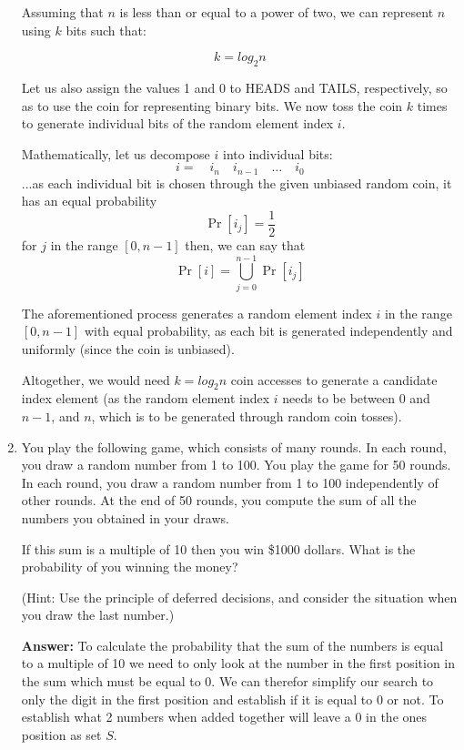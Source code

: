 \documentclass[11pt]{article}
\begin{document}
\begin{enumerate}
    Assuming that \(n\) is less than or equal to a power of two, we can represent \(n\) using \(k\) bits such that:

    \[
        k = log_{2}n
    \]

    Let us also assign the values 1 and 0 to HEADS and TAILS, respectively, so as to use the coin for representing binary bits. We now toss the coin \(k\) times to generate individual bits of the random element index \(i\). 

    Mathematically, let us decompose \(i\) into individual bits:
    \[
        i = \quad i_n \quad i_{n - 1} \quad \dots \quad i_0
    \]
    ...as each individual bit is chosen through the given unbiased random coin, it has an equal probability
    \[
        \Pr[i_j] = \frac{1}{2}
    \] for \(j\) in the range \([0, n - 1]\)
    then, we can say that
    \[
        \Pr[i] = \bigcup_{j = 0}^{n - 1}\Pr[i_j]
    \]

    The aforementioned process generates a random element index \(i\) in the range \([0, n - 1]\) with equal probability, as each bit is generated independently and uniformly (since the coin is unbiased).

    Altogether, we would need \(k = log_{2}n\) coin accesses to generate a candidate index element (as the random element index \(i\) needs to be between \(0\) and \(n - 1\), and \(n\), which is to be generated through random coin tosses).

\item You play the following game, which consists of many rounds. In each round, you draw a random number from 1 to 100.  
You play the game for 50 rounds. In each round, you draw a random number from 1 to 100 independently of other rounds. 
At the end of 50 rounds, you compute the sum of all the numbers you obtained in your draws.  

If this sum is a multiple of 10 then you win \$1000 dollars.  What is the probability of you winning the money?

(Hint: Use the principle of deferred decisions, and consider the situation when you draw the last number.) 

\textbf{Answer:} To calculate the probability that the sum of the numbers is equal to a multiple of 10 we need to only look at the number in the first position in the sum which must be equal to 0. We can therefor simplify our search to only the digit in the first position and establish if it is equal to 0 or not. To establish what 2 numbers when added together will leave a 0 in the ones position as set $S$. 


\end{enumerate}
\end{document}
